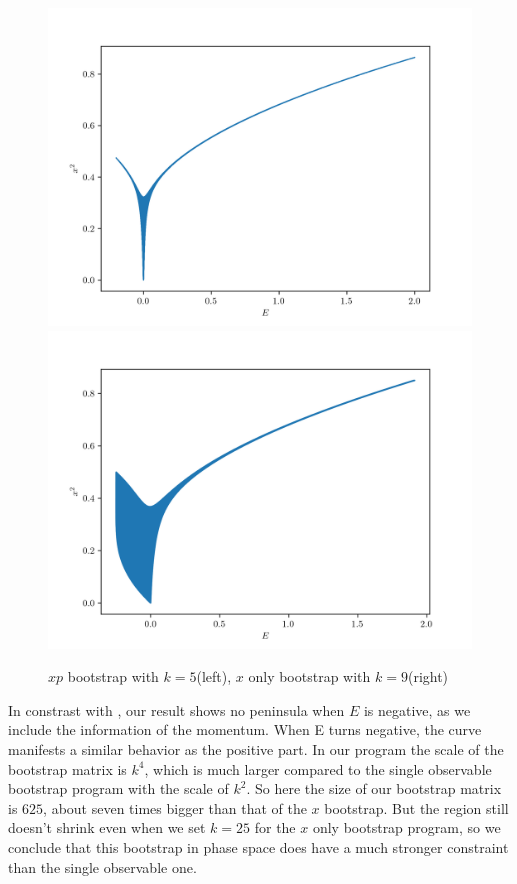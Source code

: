 \documentclass[aps, preprint,amsmath, amssymb]{revtex4-2}
\begin{document}
\begin{figure}
	\includegraphics[width=0.45\linewidth]{plot_5.png}
	\includegraphics[width=0.45\linewidth]{x_9.png}
	\caption{$xp$ bootstrap with $k = 5$(left), $x$ only bootstrap with $k = 9$(right)}
	\label{fig:doublewell}
\end{figure}

%

In constrast with \cite{Nakayama_2022}, our result shows no peninsula when $E$ is negative, as we include the information of the momentum. When E turns negative, the curve manifests a similar behavior as the positive part. In our program the scale of the bootstrap matrix is $k^4$, which is much larger compared to the single observable bootstrap program with the scale of $k^2$. So here the size of our bootstrap matrix is $625$, about seven times bigger than that of the $x$ bootstrap. But the region still doesn't shrink even when we set $k = 25$ for the $x$ only bootstrap program, so we conclude that this bootstrap in phase space does have a much stronger constraint than the single observable one.

\end{document}
